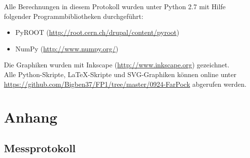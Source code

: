 \documentclass[12pt, a4paper]{scrartcl}
\title{\exptitle}
\subtitle{Fortgeschrittenen-Praktikum 1}
\author{Moritz Bitterling und Benjamin Rottler \\ Universität Freiburg}
\date{\expdate}
\numberwithin{equation}{section} %
\numberwithin{table}{section}    %
\begin{document}
\hypersetup{pageanchor=false} %

\thispagestyle{empty}

\newpage
Alle Berechnungen in diesem Protokoll wurden unter Python 2.7 mit Hilfe folgender Programmbibliotheken durchgeführt:
\begin{itemize}
  \item PyROOT (\url{http://root.cern.ch/drupal/content/pyroot})
  \item NumPy (\url{http://www.numpy.org/})
\end{itemize}
Die Graphiken wurden mit Inkscape (\url{http://www.inkscape.org}) gezeichnet.\\[\baselineskip]
Alle Python-Skripte, \LaTeX-Skripte und SVG-Graphiken können online unter \\
\url{https://github.com/Bigben37/FP1/tree/master/0924-FarPock} abgerufen werden.
\thispagestyle{empty}

\newpage
\tableofcontents
\thispagestyle{empty}

\newpage
\hypersetup{pageanchor=true} %
\setcounter{page}{1} %

 





\newpage



\appendix
\section{Anhang}
\subsection{Messprotokoll}

\end{document}
